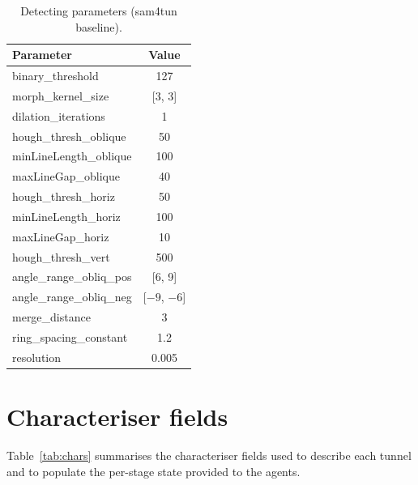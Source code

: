 \begin{table}[ht]
\caption{Detecting parameters (sam4tun baseline).}\label{tab:detect-params}
\begin{tabular*}{\tblwidth}{@{} l c @{}}
\toprule
Parameter & Value \\
\midrule
binary\_threshold & 127 \\
morph\_kernel\_size & [3, 3] \\
dilation\_iterations & 1 \\
hough\_thresh\_oblique & 50 \\
minLineLength\_oblique & 100 \\
maxLineGap\_oblique & 40 \\
hough\_thresh\_horiz & 50 \\
minLineLength\_horiz & 100 \\
maxLineGap\_horiz & 10 \\
hough\_thresh\_vert & 500 \\
angle\_range\_obliq\_pos & [6, 9] \\
angle\_range\_obliq\_neg & [$-9$, $-6$] \\
merge\_distance & 3 \\
ring\_spacing\_constant & 1.2 \\
resolution & 0.005 \\
\bottomrule
\end{tabular*}
\end{table}

\section{Characteriser fields}\label{app:chars}
Table~\ref{tab:chars} summarises the characteriser fields used to describe each tunnel and to populate the per-stage state provided to the agents.

